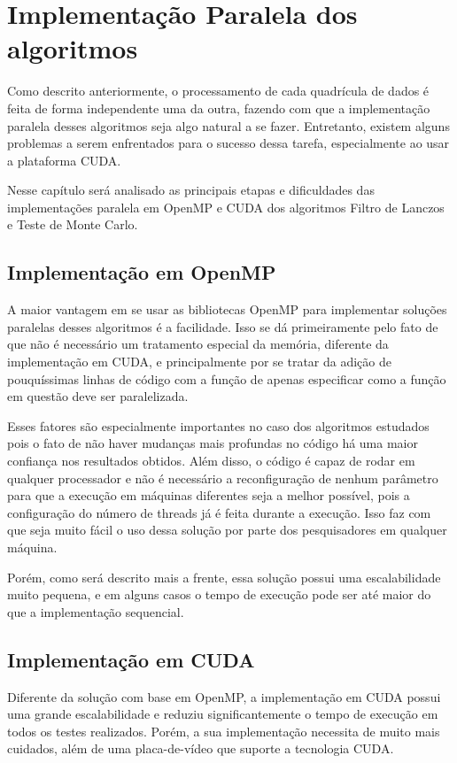\chapter{Implementação Paralela dos algoritmos}

Como descrito anteriormente, o processamento de cada quadrícula de dados é feita de forma independente uma da outra, fazendo com que a implementação paralela desses algoritmos seja algo natural a se fazer. Entretanto, existem alguns problemas a serem enfrentados para o sucesso dessa tarefa, especialmente ao usar a plataforma CUDA.

Nesse capítulo será analisado as principais etapas e dificuldades das implementações paralela em OpenMP e CUDA dos algoritmos Filtro de Lanczos e Teste de Monte Carlo.

\section{Implementação em OpenMP}

A maior vantagem em se usar as bibliotecas OpenMP para implementar soluções paralelas desses algoritmos é a facilidade. Isso se dá primeiramente pelo fato de que não é necessário um tratamento especial da memória, diferente da implementação em CUDA, e principalmente por se tratar da adição de pouquíssimas linhas de código com a função de apenas especificar como a função em questão deve ser paralelizada.

Esses fatores são especialmente importantes no caso dos algoritmos estudados pois o fato de não haver mudanças mais profundas no código há uma maior confiança nos resultados obtidos. Além disso, o código é capaz de rodar em qualquer processador e não é necessário a  reconfiguração de nenhum parâmetro para que a execução em máquinas diferentes seja a melhor possível, pois a configuração do número de threads já é feita durante a execução. Isso faz com que seja muito fácil o uso dessa solução por parte dos pesquisadores em qualquer máquina.

Porém, como será descrito mais a frente, essa solução possui uma escalabilidade muito pequena, e em alguns casos o tempo de execução pode ser até maior do que a implementação sequencial.

\section{Implementação em CUDA}

Diferente da solução com base em OpenMP, a implementação em CUDA possui uma grande escalabilidade e reduziu significantemente o tempo de execução em todos os testes realizados. Porém, a sua implementação necessita de muito mais cuidados, além de uma placa-de-vídeo que suporte a tecnologia CUDA.

